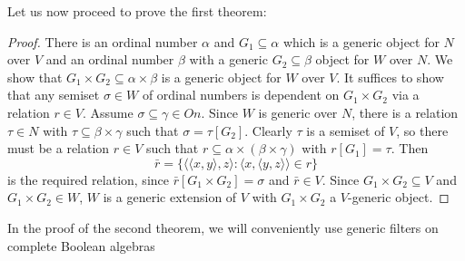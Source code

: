 Let us now proceed to prove the first theorem:

\begin{proof}
There is an ordinal number $\alpha$ and $G_1\subseteq\alpha$ which is a generic object for $N$ over $V$
and an ordinal number $\beta$ with a generic $G_2\subseteq\beta$ object for $W$ over $N$. We show that $G_1\times G_2\subseteq\alpha\times\beta$
is a generic object for $W$ over $V$. It suffices to show that any semiset $\sigma\in W$ of ordinal numbers is dependent on $G_1\times G_2$ via
a relation $r\in V$. Assume $\sigma\subseteq\gamma\in On$. Since $W$ is generic over $N$, there is a relation $\tau\in N$ with $\tau\subseteq\beta\times\gamma$
such that $\sigma=\tau[G_2]$. Clearly $\tau$ is a semiset of $V$, so there must be a relation $r\in V$ such that $r\subseteq\alpha\times(\beta\times\gamma)$
with $r[G_1]=\tau$. Then
$$ %
\bar{r}=\{\langle\langle x,y\rangle,z\rangle:\langle x,\langle y,z\rangle\rangle\in r\}
$$ %
is the required relation, since $\bar{r}[G_1\times G_2]=\sigma$ and $\bar{r}\in V$. Since $G_1\times G_2\subseteq V$ and $G_1\times G_2\in W$, $W$ is a generic
extension of $V$ with $G_1\times G_2$ a $V$-generic object.
\end{proof}

In the proof of the second theorem, we will conveniently use generic filters on complete Boolean algebras

